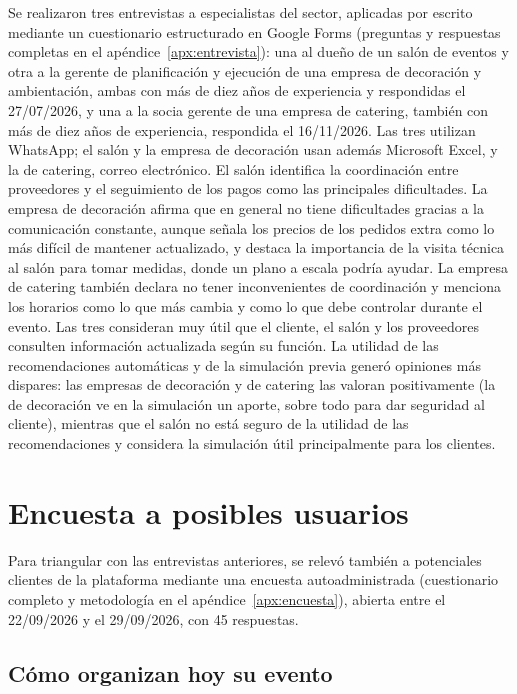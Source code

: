 Se realizaron tres entrevistas a especialistas del sector, aplicadas por
escrito mediante un cuestionario estructurado en Google Forms (preguntas
y respuestas completas en el apéndice~\ref{apx:entrevista}): una al
dueño de un salón de eventos y otra a la gerente de planificación y
ejecución de una empresa de decoración y ambientación, ambas con más de
diez años de experiencia y respondidas el 27/07/2026, y una a la socia
gerente de una empresa de catering, también con más de diez años de
experiencia, respondida el 16/11/2026. Las tres utilizan WhatsApp; el
salón y la empresa de decoración usan además Microsoft Excel, y la de
catering, correo electrónico. El salón identifica la coordinación entre
proveedores y el seguimiento de los pagos como las principales
dificultades. La empresa de decoración afirma que en general no tiene
dificultades gracias a la comunicación constante, aunque señala los
precios de los pedidos extra como lo más difícil de mantener
actualizado, y destaca la importancia de la visita técnica al salón para
tomar medidas, donde un plano a escala podría ayudar. La empresa de
catering también declara no tener inconvenientes de coordinación y
menciona los horarios como lo que más cambia y como lo que debe
controlar durante el evento. Las tres consideran muy útil que el
cliente, el salón y los proveedores consulten información actualizada
según su función. La utilidad de las recomendaciones automáticas y de la
simulación previa generó opiniones más dispares: las empresas de
decoración y de catering las valoran positivamente (la de decoración ve
en la simulación un aporte, sobre todo para dar seguridad al cliente),
mientras que el salón no está seguro de la utilidad de las
recomendaciones y considera la simulación útil principalmente para los
clientes.

\section{Encuesta a posibles usuarios}

Para triangular con las entrevistas anteriores, se relevó también a
potenciales clientes de la plataforma mediante una encuesta autoadministrada
(cuestionario completo y metodología en el apéndice~\ref{apx:encuesta}),
abierta entre el 22/09/2026 y el 29/09/2026, con 45 respuestas.

\subsection{Cómo organizan hoy su evento}


